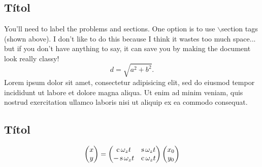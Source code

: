 \section{\mytitle}
\subsection{Títol}
You'll need to label the problems and sections.  One option is to use $\backslash$section tags (shown above).  I don't like to do this because I think it wastes too much space... but if you don't have anything to say, it can save you by making the document look really classy!
\begin{equation}
d = \sqrt{a^2+b^2}.
\end{equation}
Lorem ipsum dolor sit amet, consectetur adipisicing elit, sed do eiusmod tempor incididunt ut labore et dolore magna aliqua. Ut enim ad minim veniam, quis nostrud exercitation ullamco laboris nisi ut aliquip ex ea commodo consequat.
\subsection{Títol}
\lipsum[4-5]

\begin{align}
	\begin{pmatrix} x \\ y \end{pmatrix} = \begin{pmatrix} \Cos \omega_{z} t & \Sin \omega_{z} t \\ -\Sin \omega_{z} t & \Cos \omega_{z} t \end{pmatrix} \begin{pmatrix} x_{0} \\ y_{0} \end{pmatrix}
\end{align}
